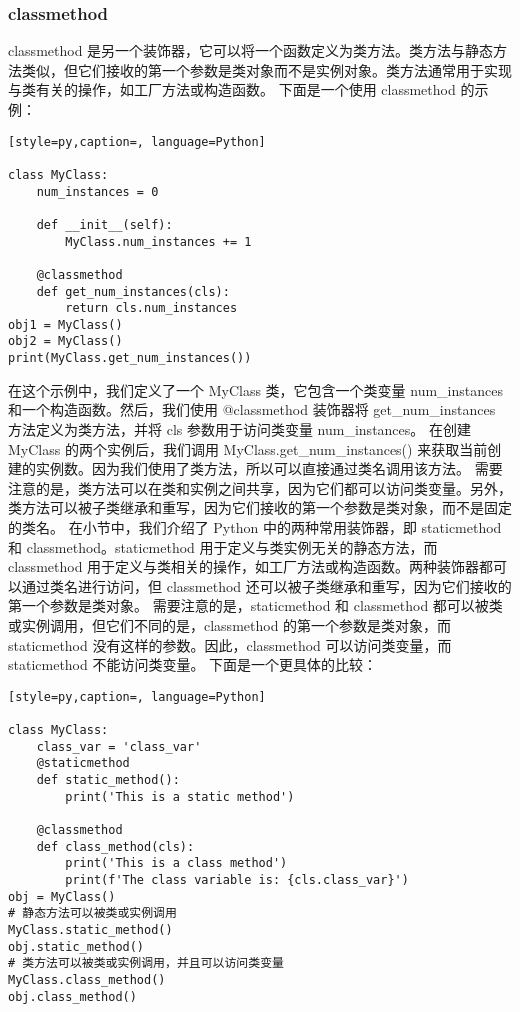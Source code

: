 \subsubsection{classmethod}
classmethod 是另一个装饰器，它可以将一个函数定义为类方法。类方法与静态方法类似，但它们接收的第一个参数是类对象而不是实例对象。类方法通常用于实现与类有关的操作，如工厂方法或构造函数。
下面是一个使用 classmethod 的示例：
\begin{lstlisting}[style=py,caption=, language=Python]

class MyClass:
    num_instances = 0
    
    def __init__(self):
        MyClass.num_instances += 1
    
    @classmethod
    def get_num_instances(cls):
        return cls.num_instances
obj1 = MyClass()
obj2 = MyClass()
print(MyClass.get_num_instances())
\end{lstlisting}
在这个示例中，我们定义了一个 MyClass 类，它包含一个类变量 num\_instances 和一个构造函数。然后，我们使用 @classmethod 装饰器将 get\_num\_instances 方法定义为类方法，并将 cls 参数用于访问类变量 num\_instances。
在创建 MyClass 的两个实例后，我们调用 MyClass.get\_num\_instances() 来获取当前创建的实例数。因为我们使用了类方法，所以可以直接通过类名调用该方法。
需要注意的是，类方法可以在类和实例之间共享，因为它们都可以访问类变量。另外，类方法可以被子类继承和重写，因为它们接收的第一个参数是类对象，而不是固定的类名。
在小节中，我们介绍了 Python 中的两种常用装饰器，即 staticmethod 和 classmethod。staticmethod 用于定义与类实例无关的静态方法，而 classmethod 用于定义与类相关的操作，如工厂方法或构造函数。两种装饰器都可以通过类名进行访问，但 classmethod 还可以被子类继承和重写，因为它们接收的第一个参数是类对象。
需要注意的是，staticmethod 和 classmethod 都可以被类或实例调用，但它们不同的是，classmethod 的第一个参数是类对象，而 staticmethod 没有这样的参数。因此，classmethod 可以访问类变量，而 staticmethod 不能访问类变量。
下面是一个更具体的比较：
\begin{lstlisting}[style=py,caption=, language=Python]

class MyClass:
    class_var = 'class_var'
    @staticmethod
    def static_method():
        print('This is a static method')
        
    @classmethod
    def class_method(cls):
        print('This is a class method')
        print(f'The class variable is: {cls.class_var}')
obj = MyClass()
# 静态方法可以被类或实例调用
MyClass.static_method()
obj.static_method()
# 类方法可以被类或实例调用，并且可以访问类变量
MyClass.class_method()
obj.class_method()
\end{lstlisting}
